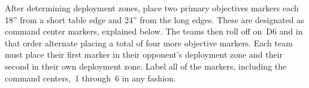 
\teaser{}

\begin{tablesetup}
  \dawnofwar

  \bigskip%
  After determining deployment zones, place two primary objectives
  markers each 18'' from a short table edge and 24'' from the long
  edges.  These are designated as command center markers, explained
  below.  The teams then roll off on~D6 and in that order alternate
  placing a total of four more objective markers.  Each team must
  place their first marker in their opponent's deployment zone and
  their second in their own deployment zone.  Label all of the
  markers, including the command centers,~1 through~6 in any fashion.


\end{tablesetup}

